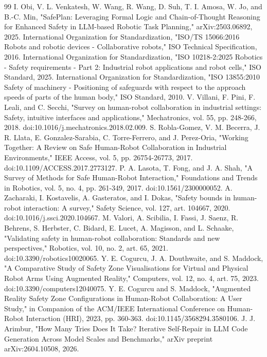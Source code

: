 \documentclass{ieeeaccess}
\begin{document}
\begin{thebibliography}{99}
 I. Obi, V. L. Venkatesh, W. Wang, R. Wang, D. Suh, T. I. Amosa, W. Jo, and B.-C. Min, "SafePlan: Leveraging Formal Logic and Chain-of-Thought Reasoning for Enhanced Safety in LLM-based Robotic Task Planning," arXiv:2503.06892, 2025.
 International Organization for Standardization, "ISO/TS 15066:2016 Robots and robotic devices - Collaborative robots," ISO Technical Specification, 2016.
 International Organization for Standardization, "ISO 10218-2:2025 Robotics - Safety requirements - Part 2: Industrial robot applications and robot cells," ISO Standard, 2025.
 International Organization for Standardization, "ISO 13855:2010 Safety of machinery - Positioning of safeguards with respect to the approach speeds of parts of the human body," ISO Standard, 2010.
 V. Villani, F. Pini, F. Leali, and C. Secchi, "Survey on human-robot collaboration in industrial settings: Safety, intuitive interfaces and applications," Mechatronics, vol. 55, pp. 248-266, 2018. doi:10.1016/j.mechatronics.2018.02.009.
 S. Robla-Gomez, V. M. Becerra, J. R. Llata, E. Gonzalez-Sarabia, C. Torre-Ferrero, and J. Perez-Oria, "Working Together: A Review on Safe Human-Robot Collaboration in Industrial Environments," IEEE Access, vol. 5, pp. 26754-26773, 2017. doi:10.1109/ACCESS.2017.2773127.
 P. A. Lasota, T. Fong, and J. A. Shah, "A Survey of Methods for Safe Human-Robot Interaction," Foundations and Trends in Robotics, vol. 5, no. 4, pp. 261-349, 2017. doi:10.1561/2300000052.
 A. Zacharaki, I. Kostavelis, A. Gasteratos, and I. Dokas, "Safety bounds in human-robot interaction: A survey," Safety Science, vol. 127, art. 104667, 2020. doi:10.1016/j.ssci.2020.104667.
 M. Valori, A. Scibilia, I. Fassi, J. Saenz, R. Behrens, S. Herbster, C. Bidard, E. Lucet, A. Magisson, and L. Schaake, "Validating safety in human-robot collaboration: Standards and new perspectives," Robotics, vol. 10, no. 2, art. 65, 2021. doi:10.3390/robotics10020065.
 Y. E. Cogurcu, J. A. Douthwaite, and S. Maddock, "A Comparative Study of Safety Zone Visualisations for Virtual and Physical Robot Arms Using Augmented Reality," Computers, vol. 12, no. 4, art. 75, 2023. doi:10.3390/computers12040075.
 Y. E. Cogurcu and S. Maddock, "Augmented Reality Safety Zone Configurations in Human-Robot Collaboration: A User Study," in Companion of the ACM/IEEE International Conference on Human-Robot Interaction (HRI), 2023, pp. 360-363. doi:10.1145/3568294.3580106.
 J. J. Arimbur, "How Many Tries Does It Take? Iterative Self-Repair in LLM Code Generation Across Model Scales and Benchmarks," arXiv preprint arXiv:2604.10508, 2026.

\end{thebibliography}
\end{document}
